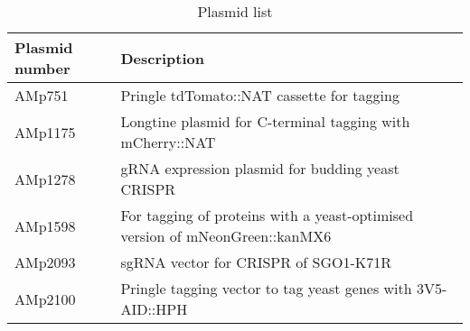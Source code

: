 \begin{table}[htb]
\centering
\renewcommand{\arraystretch}{1.5}
\caption{Plasmid list}
\label{tab:plasmids}
\begin{tabular}{p{}p{}}
\hline
\textbf{Plasmid   number} & \textbf{Description}                                                                    \\
\hline
AMp751           & Pringle tdTomato::NAT cassette for tagging                                    \\
AMp1175          & Longtine plasmid for C-terminal tagging with mCherry::NAT                      \\
AMp1278          & gRNA expression plasmid for budding yeast CRISPR                               \\
AMp1598          & For tagging of proteins with a yeast-optimised version of   mNeonGreen::kanMX6 \\
AMp2093          & sgRNA vector for CRISPR of   SGO1-K71R                                         \\
AMp2100          & Pringle tagging vector to tag   yeast genes with 3V5-AID::HPH 
\\
\hline                                                             

\end{tabular}
\end{table}

